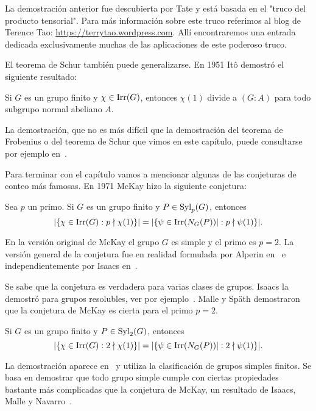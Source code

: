 La demostración anterior fue descubierta por Tate y está basada en 
el "truco del producto tensorial". Para más información 
sobre este truco referimos al blog de Terence Tao: 
\url{https://terrytao.wordpress.com}. Allí encontraremos una 
entrada dedicada exclusivamente muchas de las aplicaciones
de este poderoso truco. 

\medskip
El teorema de Schur también puede generalizarse. 
En 1951 It\^o demostró el siguiente resultado: 

\begin{theorem}[It\^o]
Si $G$ es un grupo finito y $\chi\in\operatorname{Irr}(G)$, entonces
$\chi(1)$ divide a $(G:A)$ para todo subgrupo normal abeliano $A$. 
\end{theorem}

La demostración, que no es más difícil que la demostración del 
teorema de Frobenius o del teorema de Schur que vimos en este capítulo, puede consultarse por ejemplo 
en~\cite[\S8.1]{MR0450380}. 

\medskip
Para terminar con el capítulo vamos a mencionar algunas de las conjeturas de conteo más famosas. 
En 1971 McKay hizo la siguiente conjetura:

\begin{conjecture}[McKay]
Sea $p$ un primo. 
Si $G$ es un grupo finito y $P\in\mathrm{Syl}_p(G)$, entonces
\[
|\{\chi\in\operatorname{Irr}(G):p\nmid \chi(1)\}|
=|\{\psi\in\operatorname{Irr}(N_G(P))|:p\nmid\psi(1)\}|.
\]
\end{conjecture}

En la versión original de McKay el grupo $G$ es simple y el primo es $p=2$. La versión general 
de la conjetura fue en realidad formulada por Alperin en~\cite{MR0404417} e independientemente
por Isaacs en~\cite{MR332945}.

Se sabe que la conjetura es verdadera para varias clases de grupos. 
Isaacs la demostró para grupos resolubles, ver por ejemplo~\cite{MR332945,MR3791517}. Malle y Sp\"ath demostraron que 
la conjetura de McKay es cierta para el primo $p=2$. 

\begin{theorem}
Si $G$ es un grupo finito y $P\in\mathrm{Syl}_2(G)$, entonces
\[
|\{\chi\in\operatorname{Irr}(G):2\nmid \chi(1)\}|
=|\{\psi\in\operatorname{Irr}(N_G(P))|:2\nmid\psi(1)\}|.
\]
\end{theorem}

La demostración aparece en~\cite{MR3549625} y utiliza 
la clasificación de grupos simples finitos. Se basa en 
demostrar que todo grupo simple cumple con ciertas propiedades 
bastante más complicadas que la conjetura de McKay, 
un resultado de Isaacs, Malle y Navarro~\cite{MR2336079}. 

